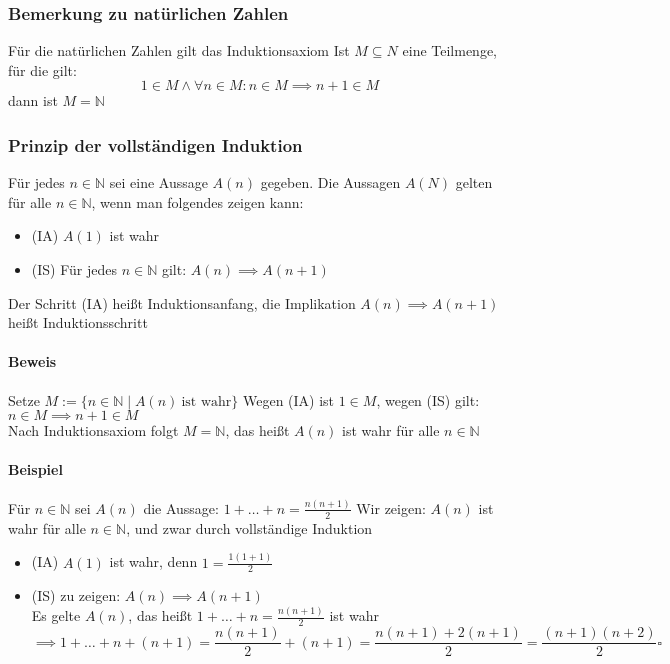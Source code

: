 \documentclass[a4paper]{scrartcl}
\DeclareMathOperator{\Forall}{\forall}
\theoremstyle{definition}
\theoremstyle{plain}
\theoremstyle{plain}
\theoremstyle{remark}
\theoremstyle{remark}
\theoremstyle{remark}
\theoremstyle{remark}
\theoremstyle{remark}
\begin{document}
\subsubsection{Bemerkung zu natürlichen Zahlen}
\label{sec-2-4-14}
Für die natürlichen Zahlen gilt das Induktionsaxiom
Ist $M\subseteq N$ eine Teilmenge, für die gilt:
\[1\in M \wedge \Forall n\in M : n\in M \implies n+1 \in M\]
dann ist $M = \mathbb{N}$
\subsubsection{Prinzip der vollständigen Induktion}
\label{sec-2-4-15}
Für jedes $n\in \mathbb{N}$ sei eine Aussage $A(n)$ gegeben. Die Aussagen $A(N)$ gelten für alle $n\in\mathbb{N}$, wenn man folgendes zeigen kann: \\
\begin{itemize}
\item (IA) $A(1)$ ist wahr
\item (IS) Für jedes $n\in\mathbb{N}$ gilt: $A(n) \implies A(n+1)$
\end{itemize}
Der Schritt (IA) heißt Induktionsanfang, die Implikation $A(n) \implies A(n+1)$ heißt Induktionsschritt
\paragraph{Beweis}
\label{sec-2-4-15-1}
Setze $M := \{n\in \mathbb{N}\mid A(n)~\text{ist wahr}\}$
Wegen (IA) ist $1\in M$, wegen (IS) gilt: $n\in M \implies n+1 \in M$ \\
     Nach Induktionsaxiom folgt $M = \mathbb{N}$, das heißt $A(n)$ ist wahr für alle $n\in \mathbb{N}$
\paragraph{Beispiel}
\label{sec-2-4-15-2}
Für $n\in\mathbb{N}$ sei $A(n)$ die Aussage: $1+\ldots + n = \frac{n(n+1)}{2}$
Wir zeigen: $A(n)$ ist wahr für alle $n\in \mathbb{N}$, und zwar durch vollständige Induktion
\begin{itemize}
\item (IA) $A(1)$ ist wahr, denn $1 = \frac{1(1+1)}{2}$
\item (IS) zu zeigen: $A(n) \implies A(n+1)$ \\
       Es gelte $A(n)$, das heißt $1+\ldots+n = \frac{n(n+1)}{2}$ ist wahr \[\implies 1 + \ldots + n + (n + 1) = \frac{n(n+1)}{2} + (n+1) =  \frac{n(n+1) + 2(n+1)}{2} = \frac{(n+1)(n+2)}{2} \square\]
\end{itemize}
\end{document}
